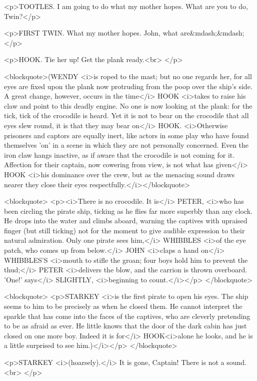 <p>TOOTLES. I am going to do what my mother hopes. What are you to
do, Twin?</p>

<p>FIRST TWIN. What my mother hopes. John, what are&mdash;&mdash;</p>

<p>HOOK. Tie her up! Get the plank ready.<br>
</p>

<blockquote>(WENDY <i>is roped to the mast; but no one regards her,
for all eyes are fixed upon the plank now protruding from the poop
over the ship's side. A great change, however, occurs in the time</i>
HOOK <i>takes to raise his claw and point to this deadly engine. No
one is now looking at the plank: for the tick, tick of the crocodile
is heard. Yet it is not to bear on the crocodile that all eyes slew
round, it is that they may bear on</i> HOOK. <i>Otherwise prisoners
and captors are equally inert, like actors in some play who have
found themselves 'on' in a scene in which they are not personally
concerned. Even the iron claw hangs inactive, as if aware that the
crocodile is not coming for it. Affection for their captain, now
cowering from view, is not what has given</i> HOOK <i>his dominance
over the crew, but as the menacing sound draws nearer they close
their eyes respectfully.</i></blockquote>

<blockquote>
<p><i>There is no crocodile. It is</i> PETER, <i>who has been
circling the pirate ship, ticking as he flies far more superbly than
any clock. He drops into the water and climbs aboard, warning the
captives with upraised finger (but still ticking) not for the moment
to give audible expression to their natural admiration. Only one
pirate sees him,</i> WHIBBLES <i>of the eye patch, who comes up from
below.</i> JOHN <i>claps a hand on</i> WHIBBLES'S <i>mouth to stifle
the groan; four boys hold him to prevent the thud;</i> PETER
<i>delivers the blow, and the carrion is thrown overboard. 'One!'
says</i> SLIGHTLY, <i>beginning to count.</i></p>
</blockquote>

<blockquote>
<p>STARKEY <i>is the first pirate to open his eyes. The ship seems to
him to be precisely as when he closed them. He cannot interpret the
sparkle that has come into the faces of the captives, who are
cleverly pretending to be as afraid as ever. He little knows that the
door of the dark cabin has just closed on one more boy. Indeed it is
for</i> HOOK<i>alone he looks, and he is a little surprised to see
him.)</i></p>
</blockquote>

<p>STARKEY <i>(hoarsely).</i> It is gone, Captain! There is not a
sound.<br>
</p>

